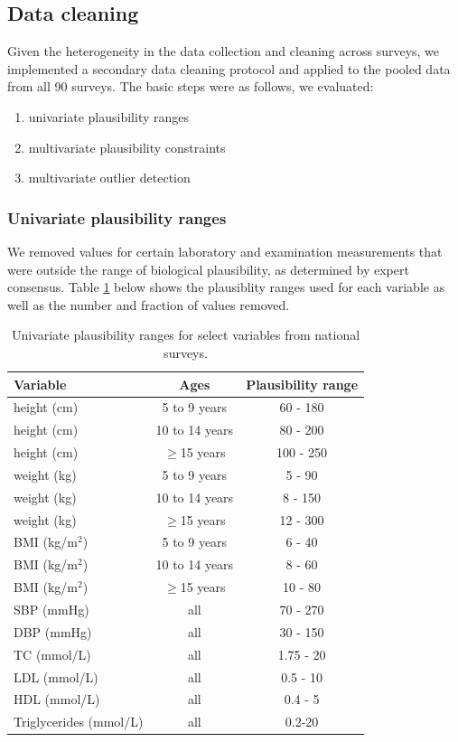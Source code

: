 \documentclass[12pt]{article}
\begin{document}
\begin{appendix}
    \subsection{Data cleaning}
    Given the heterogeneity in the data collection and cleaning across surveys, we implemented a secondary data cleaning protocol and applied to the pooled data from all 90 surveys. The basic steps were as follows, we evaluated:
    \begin{enumerate}
        \item univariate plausibility ranges
        \item multivariate plausibility constraints
        \item multivariate outlier detection
    \end{enumerate}

    \subsubsection{Univariate plausibility ranges}
    We removed values for certain laboratory and examination measurements that were outside the range of biological plausibility, as determined by expert consensus. Table \ref{tab:plausibility} below shows the plausiblity ranges used for each variable as well as the number and fraction of values removed.

    \begin{table}[h]
        \centering
        \caption{Univariate plausibility ranges for select variables from national surveys.}
        \begin{tabular}{lcc}
            \hline
            Variable & Ages & Plausibility range \\
            \hline
            height (cm) & 5 to 9 years & 60 - 180 \\
            height (cm) & 10 to 14 years & 80 - 200 \\
            height (cm) & $\geq$15 years & 100 - 250 \\
            weight (kg) & 5 to 9 years & 5 - 90 \\
            weight (kg) & 10 to 14 years & 8 - 150 \\
            weight (kg) & $\geq$15 years & 12 - 300 \\
            BMI (kg/m$^2$) & 5 to 9 years & 6 - 40 \\
            BMI (kg/m$^2$) & 10 to 14 years & 8 - 60 \\
            BMI (kg/m$^2$) & $\geq$15 years & 10 - 80 \\
            SBP (mmHg) & all & 70 - 270 \\
            DBP (mmHg) & all & 30 - 150 \\
            TC (mmol/L) & all & 1.75 - 20 \\
            LDL (mmol/L) & all & 0.5 - 10 \\
            HDL (mmol/L) & all & 0.4 - 5 \\
            Triglycerides (mmol/L) & all & 0.2-20 \\
            \hline
        \end{tabular}
        \label{tab:plausibility}
    \end{table}


\end{appendix}
\end{document}

